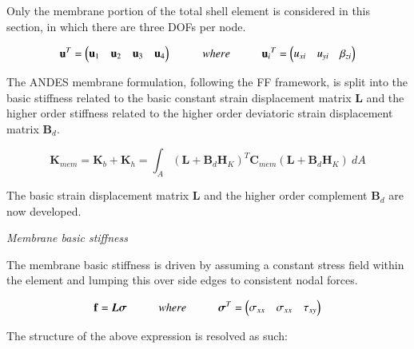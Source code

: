 Only the membrane portion of the total shell element is considered in this section, in which there are three DOFs per node.

\begin{equation} 
\mathbf{u}^T = 
\begin{pmatrix}
\mathbf{u}_1 & \mathbf{u}_2 & \mathbf{u}_3 & \mathbf{u}_4
\end{pmatrix} 
\hspace{10mm}
where
\hspace{10mm}
\mathbf{u}{_i}^T = 
\begin{pmatrix}
{u_{xi}} & {u_{yi}} & {\beta_{zi}}
\end{pmatrix}
\label{equation04}
\end{equation}

The ANDES membrane formulation, following the FF framework, is split into the basic stiffness related to the basic constant strain displacement matrix $\mathbf{L}$ and the higher order stiffness related to the higher order deviatoric strain displacement matrix $\mathbf{B}_d$.

\begin{equation} 
\mathbf{K}_{mem} = \mathbf{K}_{b} + \mathbf{K}_{h} = \int_A (\mathbf{L} + \mathbf{B}_d  \mathbf{H}_K)^T \mathbf{C}_{mem} (\mathbf{L} + \mathbf{B}_d \mathbf{H}_K)\ dA
\label{equationMEM}
\end{equation}

The basic strain displacement matrix $\mathbf{L}$ and the higher order complement $\mathbf{B}_d$ are now developed. 

\textit{Membrane basic stiffness}

The membrane basic stiffness is driven by assuming a constant stress field within the element and lumping this over side edges to consistent nodal forces. 

\begin{equation} 
\mathbf{f} = \boldsymbol{L\sigma}
\hspace{10mm}
where
\hspace{10mm}
\boldsymbol{\sigma}^T =
\begin{pmatrix}
\sigma_{xx} & \sigma_{xx} & \tau_{xy}
\end{pmatrix}
\label{equation05}
\end{equation}

The structure of the above expression is resolved as such: 

